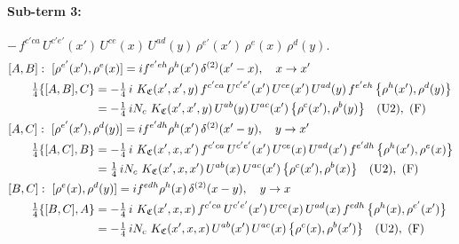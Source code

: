 \documentclass[10pt]{article}
\numberwithin{equation}{section}
\begin{document}
\paragraph{Sub-term 3:} $-\,f^{c'ca}\,U^{c'e'}(x')\,U^{ce}(x)\,U^{ad}(y)\,\rho^{e'}(x')\,\rho^{e}(x)\,\rho^{d}(y)$.
\begin{align}
&[A,B]:\ [\rho^{e'}(x'),\rho^{e}(x)]=i f^{e'eh}\rho^{h}(x')\,\delta^{(2)}(x'-x),\quad x\to x'\notag\\
&\qquad \tfrac14\{[A,B],C\}=-\tfrac14\,i\,\,K_{\mathfrak C}(x',x',y)\,f^{c'ca}\,U^{c'e'}(x')\,U^{ce}(x')\,U^{ad}(y)\,f^{e'eh}\,\big\{\rho^{h}(x'),\rho^{d}(y)\big\}\notag\\
&\qquad\phantom{\tfrac14\{[A,B],C\}}=-\tfrac14\,i N_{c}\,\,K_{\mathfrak C}(x',x',y)\,U^{ab}(y)\,U^{ac}(x')\,\big\{\rho^{c}(x'),\rho^{b}(y)\big\}\quad\text{(U2)},\ \text{(F)}
\label{R:eq:GIII.V-3-AB}\\
&[A,C]:\ [\rho^{e'}(x'),\rho^{d}(y)]=i f^{e'dh}\rho^{h}(x')\,\delta^{(2)}(x'-y),\quad y\to x'\notag\\
&\qquad \tfrac14\{[A,C],B\}=-\tfrac14\,i\,\,K_{\mathfrak C}(x',x,x')\,f^{c'ca}\,U^{c'e'}(x')\,U^{ce}(x)\,U^{ad}(x')\,f^{e'dh}\,\big\{\rho^{h}(x'),\rho^{e}(x)\big\}\notag\\
&\qquad\phantom{\tfrac14\{[A,C],B\}}=\tfrac14\,i N_{c}\,\,K_{\mathfrak C}(x',x,x')\,U^{ab}(x)\,U^{ac}(x')\,\big\{\rho^{c}(x'),\rho^{b}(x)\big\}\quad\text{(U2)},\ \text{(F)}
\label{R:eq:GIII.V-3-AC}\\
&[B,C]:\ [\rho^{e}(x),\rho^{d}(y)]=i f^{edh}\rho^{h}(x)\,\delta^{(2)}(x-y),\quad y\to x\notag\\
&\qquad \tfrac14\{[B,C],A\}=-\tfrac14\,i\,\,K_{\mathfrak C}(x',x,x)\,f^{c'ca}\,U^{c'e'}(x')\,U^{ce}(x)\,U^{ad}(x)\,f^{edh}\,\big\{\rho^{h}(x),\rho^{e'}(x')\big\}\notag\\
&\qquad\phantom{\tfrac14\{[B,C],A\}}=-\tfrac14\,i N_{c}\,\,K_{\mathfrak C}(x',x,x)\,U^{ab}(x')\,U^{ac}(x)\,\big\{\rho^{c}(x),\rho^{b}(x')\big\}\quad\text{(U2)},\ \text{(F)}
\label{R:eq:GIII.V-3-BC}
\end{align}
\end{document}

